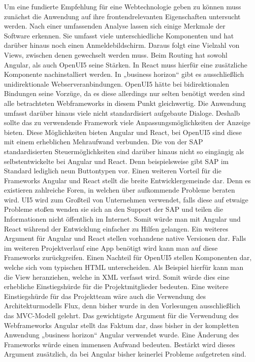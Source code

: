 Um eine fundierte Empfehlung für eine Webtechnologie geben zu können muss zunächst die Anwendung auf ihre frontendrelevanten Eigenschaften untersucht werden. Nach einer umfassenden Analyse lassen sich einige Merkmale der Software erkennen. 
Sie umfasst viele unterschiedliche Komponenten und hat darüber hinaus noch einen Anmeldebildschirm. Daraus folgt eine Vielzahl von Views, zwischen denen gewechselt werden muss. Beim Routing hat sowohl Angular, als auch OpenUI5 seine Stärken. In React muss hierfür eine zusätzliche Komponente nachinstalliert werden.
In „business horizon“ gibt es ausschließlich unidirektionale Webserveranbindungen. OpenUI5 hätte bei bidirektionalen Bindungen seine Vorzüge, da es diese allerdings nur selten benötigt werden sind alle betrachteten Webframeworks in diesem Punkt gleichwertig.
Die Anwendung umfasst darüber hinaus viele nicht standardisiert aufgebaute Dialoge. Deshalb sollte das zu verwendende Framework viele Anpassungsmöglichkeiten der Anzeige bieten. Diese Möglichkeiten bieten Angular und React, bei OpenUI5 sind diese mit einem erheblichen Mehraufwand verbunden. Die von der SAP standardisierten Steuermöglichkeiten sind darüber hinaus nicht so eingängig als selbstentwickelte bei Angular und React. Denn beispielsweise gibt SAP im Standard lediglich neun Buttontypen vor\autocites[vgl.][]{UI5Doku1}.
Einen weiteren Vorteil für die Frameworks Angular und React stellt die breite Entwicklergemeinde dar. Denn es existieren zahlreiche Foren, in welchen über aufkommende Probleme beraten wird. UI5 wird zum Großteil von Unternehmen verwendet, falls diese auf etwaige Probleme stoßen wenden sie sich an den Support der SAP und teilen die Informationen nicht öffentlich im Internet. Somit würde man mit Angular und React während der Entwicklung einfacher zu Hilfen gelangen.
Ein weiteres Argument für Angular und React stellen vorhandene native Versionen dar. Falls im weiteren Projektverlauf eine App benötigt wird kann man auf diese Frameworks zurückgreifen.
Einen Nachteil für OpenUI5 stellen Komponenten dar, welche sich vom typischen HTML unterscheiden. Als Beispiel hierfür kann man die View heranziehen, welche in XML verfasst wird. Somit würde dies eine erhebliche Einstiegshürde für die Projektmitglieder bedeuten.
Eine weitere Einstiegshürde für das Projektteam wäre auch die Verwendung des Architekturmodells Flux, denn bisher wurde in den Vorlesungen ausschließlich das MVC-Modell gelehrt.
Das gewichtigste Argument für die Verwendung des Webframeworks Angular stellt das Faktum dar, dass bisher in der kompletten Anwendung „business horizon“ Angular verwendet wurde. Eine Änderung des Frameworks würde einen immensen Aufwand bedeuten. Bestärkt wird dieses Argument zusätzlich, da bei Angular bisher keinerlei Probleme aufgetreten sind.

